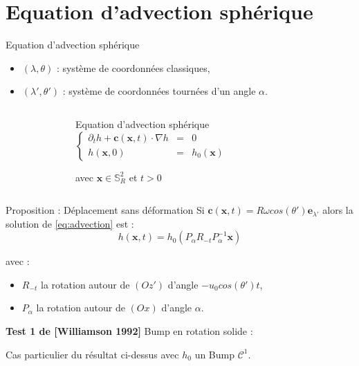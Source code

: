 \documentclass[11pt]{beamer}
\begin{document}
\section{Equation d'advection sphérique}
\begin{frame}{Equation d'advection sphérique}

\begin{itemize}
\item $(\lambda, \theta)$ : système de coordonnées classiques,
\item $(\lambda', \theta')$ : système de coordonnées tournées d'un angle $\alpha$.
\end{itemize}

\begin{columns}
\begin{figure}
\def\svgwidth{0.6 \textwidth}
\vspace{0.5cm}

\end{figure}

\begin{block}{Equation d'advection sphérique}
\begin{equation}
\left\lbrace
\begin{array}{rcl}
\partial_t h+ \mathbf{c}(\mathbf{x},t)\cdot \nabla h &=& 0 \\
h(\mathbf{x},0) &=& h_0(\mathbf{x}) 
\end{array}
\right.
\label{eq:advection}
\end{equation}

avec $\mathbf{x} \in \mathbb{S}_R^2$ et $t>0$
\end{block}


\end{columns}


\end{frame}

\begin{frame}
\begin{block}{Proposition : Déplacement sans déformation}
Si $\mathbf{c}(\mathbf{x},t)=R \omega cos ( \theta') \mathbf{e}_{\lambda'}$ alors la solution de \eqref{eq:advection} est :
$$h(\mathbf{x},t)=h_0(P_{\alpha}R_{-t}P_{\alpha}^{-1} \mathbf{x})$$
\end{block}

avec :

\begin{itemize}
\item $R_{-t}$ la rotation autour de $(Oz')$ d'angle $-u_0 cos( \theta' ) t$,

\item $P_{\alpha}$ la rotation autour de $(Ox)$ d'angle $\alpha$.
\end{itemize}

\pause
\textbf{Test 1 de [Williamson 1992]} Bump en rotation solide :

Cas particulier du résultat ci-dessus avec $h_0$ un Bump $\mathcal{C}^1$.

\end{frame}
\end{document}
